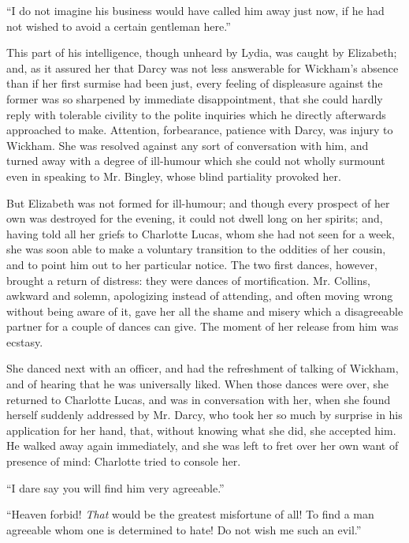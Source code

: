 ``I do not imagine his business would have called him away just now, if he had not wished to avoid a certain gentleman here.''

This part of his intelligence, though unheard by Lydia, was caught by Elizabeth; and, as it assured her that Darcy was not less answerable for Wickham's absence than if her first surmise had been just, every feeling of displeasure against the former was so sharpened by immediate disappointment, that she could hardly reply with tolerable civility to the polite inquiries which he directly afterwards approached to make. Attention, forbearance, patience with Darcy, was injury to Wickham. She was resolved against any sort of conversation with him, and turned away with a degree of ill-humour which she could not wholly surmount even in speaking to Mr. Bingley, whose blind partiality provoked her.

But Elizabeth was not formed for ill-humour; and though every prospect of her own was destroyed for the evening, it could not dwell long on her spirits; and, having told all her griefs to Charlotte Lucas, whom she had not seen for a week, she was soon able to make a voluntary transition to the oddities of her cousin, and to point him out to her particular notice. The two first dances, however, brought a return of distress: they were dances of mortification. Mr. Collins, awkward and solemn, apologizing instead of attending, and often moving wrong without being aware of it, gave her all the shame and misery which a disagreeable partner for a couple of dances can give. The moment of her release from him was ecstasy.

She danced next with an officer, and had the refreshment of talking of Wickham, and of hearing that he was universally liked. When those dances were over, she returned to Charlotte Lucas, and was in conversation with her, when she found herself suddenly addressed by Mr. Darcy, who took her so much by surprise in his application for her hand, that, without knowing what she did, she accepted him. He walked away again immediately, and she was left to fret over her own want of presence of mind: Charlotte tried to console her.

``I dare say you will find him very agreeable.''

``Heaven forbid! \textit{That} would be the greatest misfortune of all! To find a man agreeable whom one is determined to hate! Do not wish me such an evil.''

